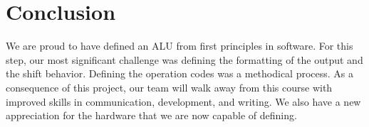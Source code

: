 \documentclass[12pt]{article}
\begin{document}
\section{Conclusion}
We are proud to have defined an ALU from first principles in software. For this step, our most significant challenge was defining the formatting of the output and the shift behavior. Defining the operation codes was a methodical process. As a consequence of this project, our team will walk away from this course with improved skills in communication, development, and writing. We also have a new appreciation for the hardware that we are now capable of defining.
\end{document}
